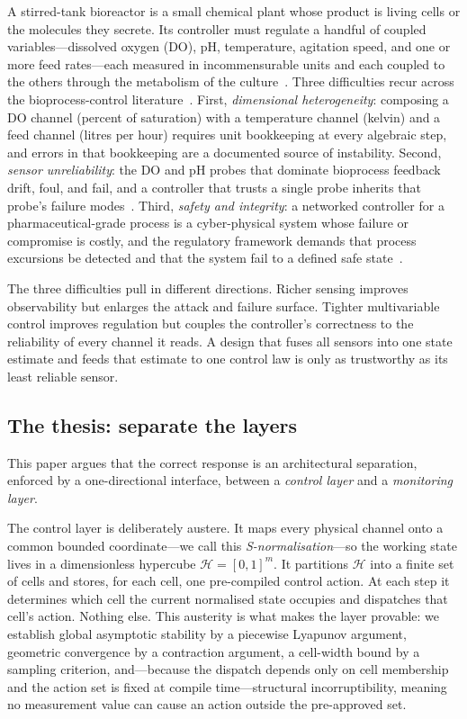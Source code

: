 \documentclass[11pt,a4paper,twocolumn]{article}
\theoremstyle{thmstyle}
\theoremstyle{definition}
\theoremstyle{remark}
\newcommand{\Hs}{\mathcal{H}}
\begin{document}
A stirred-tank bioreactor is a small chemical plant whose product is
living cells or the molecules they secrete. Its controller must regulate
a handful of coupled variables---dissolved oxygen (DO), pH, temperature,
agitation speed, and one or more feed rates---each measured in
incommensurable units and each coupled to the others through the
metabolism of the culture~\citep{doran2013bioprocess,shuler2017bioprocess}.
Three difficulties recur across the bioprocess-control
literature~\citep{alford2006bioprocess,mandenius2016challenges}. First,
\emph{dimensional heterogeneity}: composing a DO channel (percent of
saturation) with a temperature channel (kelvin) and a feed channel
(litres per hour) requires unit bookkeeping at every algebraic step, and
errors in that bookkeeping are a documented source of instability.
Second, \emph{sensor unreliability}: the DO and pH probes that dominate
bioprocess feedback drift, foul, and fail, and a controller that trusts a
single probe inherits that probe's failure
modes~\citep{garcia2009review,luttmann2012softsensors}. Third,
\emph{safety and integrity}: a networked controller for a
pharmaceutical-grade process is a cyber-physical system whose failure or
compromise is costly, and the regulatory framework demands that process
excursions be detected and that the system fail to a defined safe
state~\citep{fda2004pat,cardenas2008secure}.

The three difficulties pull in different directions. Richer sensing
improves observability but enlarges the attack and failure surface.
Tighter multivariable control improves regulation but couples the
controller's correctness to the reliability of every channel it reads. A
design that fuses all sensors into one state estimate and feeds that
estimate to one control law is only as trustworthy as its least reliable
sensor.

\subsection{The thesis: separate the layers}

This paper argues that the correct response is an architectural
separation, enforced by a one-directional interface, between a
\emph{control layer} and a \emph{monitoring layer}.

The control layer is deliberately austere. It maps every physical
channel onto a common bounded coordinate---we call this
\emph{S-normalisation}---so the working state lives in a
dimensionless hypercube $\Hs = [0,1]^{m}$. It partitions $\Hs$ into a
finite set of cells and stores, for each cell, one pre-compiled control
action. At each step it determines which cell the current normalised
state occupies and dispatches that cell's action. Nothing else. This
austerity is what makes the layer provable: we establish global
asymptotic stability by a piecewise Lyapunov argument, geometric
convergence by a contraction argument, a cell-width bound by a
sampling criterion, and---because the dispatch depends only on
cell membership and the action set is fixed at compile time---structural
incorruptibility, meaning no measurement value can cause an action
outside the pre-approved set.
\end{document}
